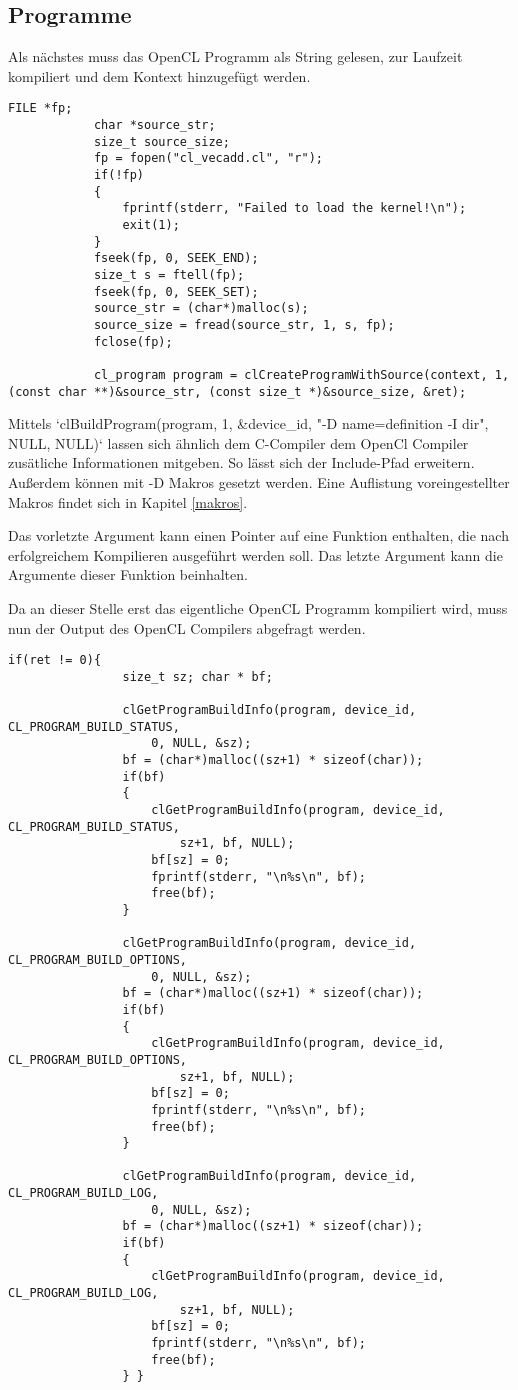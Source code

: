 			\subsection{Programme}
			Als nächstes muss das OpenCL Programm als String gelesen, zur Laufzeit kompiliert und dem Kontext hinzugefügt werden. 
			\begin{lstlisting}[caption=~OpenCL Programm]
			FILE *fp;
			char *source_str;
			size_t source_size;
			fp = fopen("cl_vecadd.cl", "r");
			if(!fp)
			{
				fprintf(stderr, "Failed to load the kernel!\n");
				exit(1);
			}
			fseek(fp, 0, SEEK_END);
			size_t s = ftell(fp);
			fseek(fp, 0, SEEK_SET); 
			source_str = (char*)malloc(s);
			source_size = fread(source_str, 1, s, fp);
			fclose(fp);
			
			cl_program program = clCreateProgramWithSource(context, 1, (const char **)&source_str, (const size_t *)&source_size, &ret);
			\end{lstlisting}
			
			Mittels \li`clBuildProgram(program, 1, &device_id, "-D name=definition -I dir", NULL, NULL)` lassen sich ähnlich dem C-Compiler dem OpenCl Compiler zusätliche Informationen mitgeben. So lässt sich der Include-Pfad erweitern. Außerdem können mit -D Makros gesetzt werden. Eine Auflistung voreingestellter Makros findet sich in Kapitel \ref{makros}.
			
			Das vorletzte Argument kann einen Pointer auf eine Funktion enthalten, die nach erfolgreichem Kompilieren ausgeführt werden soll. Das letzte Argument kann die Argumente dieser Funktion beinhalten.
			
			Da an dieser Stelle erst das eigentliche OpenCL Programm kompiliert wird, muss nun der Output des OpenCL Compilers abgefragt werden.
			
			\newpage			
			\begin{lstlisting}[caption=~Fehlerabfrage OpenCL Compiler]
			if(ret != 0){
				size_t sz; char * bf;

				clGetProgramBuildInfo(program, device_id, CL_PROGRAM_BUILD_STATUS, 
					0, NULL, &sz);
				bf = (char*)malloc((sz+1) * sizeof(char));
				if(bf)
				{
					clGetProgramBuildInfo(program, device_id, CL_PROGRAM_BUILD_STATUS, 
						sz+1, bf, NULL);
					bf[sz] = 0;
					fprintf(stderr, "\n%s\n", bf);
					free(bf);
				}

				clGetProgramBuildInfo(program, device_id, CL_PROGRAM_BUILD_OPTIONS, 
					0, NULL, &sz);
				bf = (char*)malloc((sz+1) * sizeof(char));
				if(bf)
				{
					clGetProgramBuildInfo(program, device_id, CL_PROGRAM_BUILD_OPTIONS, 
						sz+1, bf, NULL);
					bf[sz] = 0;
					fprintf(stderr, "\n%s\n", bf);
					free(bf);
				}
				
				clGetProgramBuildInfo(program, device_id, CL_PROGRAM_BUILD_LOG, 
					0, NULL, &sz);
				bf = (char*)malloc((sz+1) * sizeof(char));
				if(bf)
				{
					clGetProgramBuildInfo(program, device_id, CL_PROGRAM_BUILD_LOG, 
						sz+1, bf, NULL);
					bf[sz] = 0;
					fprintf(stderr, "\n%s\n", bf);
					free(bf);
				} }
			\end{lstlisting}
			
